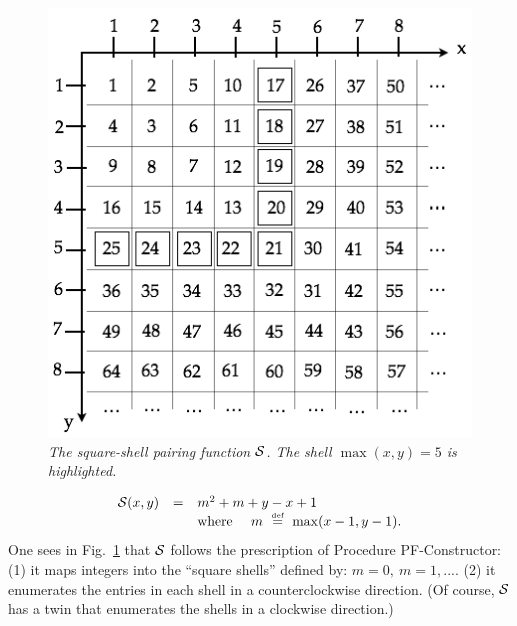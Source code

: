 \begin{figure}[htb]
\begin{center}
   \includegraphics[scale=0.4]{FiguresArithmetic/PairingSquareShell}
\end{center}
\caption{{\it The square-shell pairing function $\mbox{$\cal S$}$.  The shell $\max(x,y) = 5$ is highlighted.}
\label{fig:pairingSquareShell}}
\end{figure}
\begin{equation}
\label{e.square}
\begin{array}{ccl}
\s(x, y) & = & m^2 + m + y-x+1 \\
           &     & \mbox{where } \ \ \  m \ \eqdef \ \max(x-1,y-1).
\end{array}
\end{equation}
One sees in Fig.~\ref{fig:pairingSquareShell} that $\mbox{$\cal S$}$ follows the prescription of Procedure PF-Constructor: (1) it maps integers into the ``square shells'' defined by: $m = 0, \ m = 1, ...$.  (2) it
enumerates the entries in each shell in a counterclockwise direction.  (Of course, $\mbox{$\cal S$}$ has a twin that enumerates the shells in a clockwise direction.)

